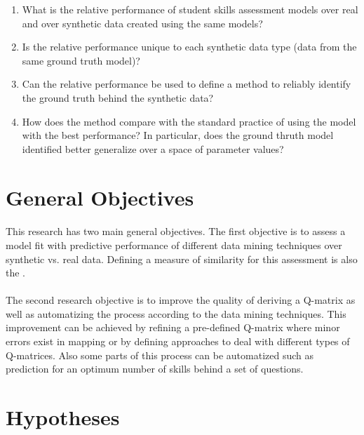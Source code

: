 \begin{enumerate}
\item What is the relative performance of student skills assessment models over real and over synthetic data created using the same models?
\item Is the relative performance unique to each synthetic data type (data from the same ground truth model)?
\item Can the relative performance be used to define a method to reliably identify the ground truth behind the synthetic data?
\item How does the method compare with the standard practice of using the model with the best performance?  In particular, does the ground thruth model identified better generalize over a space of parameter values?
\end{enumerate}


\section{General Objectives}
\paragraph{}This research has two main general objectives. The first objective is to assess a model fit with predictive performance of different data mining techniques over synthetic vs. real data. Defining a measure of similarity for this assessment is also the .

\paragraph{}The second research objective is to improve the quality of deriving a Q-matrix as well as automatizing the process according to the data mining techniques. This improvement can be achieved by refining a pre-defined Q-matrix where minor errors exist in mapping or by defining approaches to deal with different types of Q-matrices. Also some parts of this process can be automatized such as prediction for an optimum number of skills behind a set of questions.

\section{Hypotheses}
